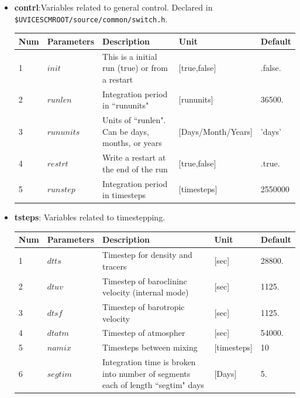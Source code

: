 \documentclass[a4paper]{article}
\begin{document}
\begin{itemize}

\item \textbf{contrl}:Variables related to general control. Declared in \verb|$UVICESCMROOT/source/common/switch.h|.
{\footnotesize
\begin{longtable}{lllll} \hline
  Num  & Parameters         & Description                                                                      & Unit                  & Default    \\ \hline 
  1    & $init$             & This is a initial run (true) or from a restart                                   & [true,false]          & .false.    \\
  2    & $runlen$           & Integration period in ``rununits"                                                & [rununits]            & 36500.     \\
  3    & $rununits$         & Units of ``runlen". Can be days, months, or years                                & [Days/Month/Years]    & 'days'     \\
  4    & $restrt$           & Write a restart at the end of the run                                            & [true,false]          & .true.     \\
  5    & $runstep$          & Integration period in timesteps                                                  & [timesteps]           & 2550000    \\ \hline
    \end{longtable}}
\item \textbf{tsteps}: Variables related to timestepping. 
{\footnotesize
\begin{longtable}{lllll} \hline
  Num  & Parameters         & Description                                                                      & Unit                  & Default    \\ \hline 
  1    & $dtts$             & Timestep for density and tracers                                                 & [sec]                 & 28800.     \\
  2    & $dtuv$             & Timestep of baroclininc velocity (internal mode)                                 & [sec]                 & 1125.      \\
  3    & $dtsf$             & Timestep of barotropic velocity                                                  & [sec]                 & 1125.      \\
  4    & $dtatm$            & Timestep of atmospher                                                            & [sec]                 & 54000.     \\
  5    & $namix$            & Timesteps between mixing                                                         & [timesteps]           & 10         \\
  6    & $segtim$           & Integration time is broken into number of segments each of length ``segtim" days & [Days]                & 5.        \\ \hline
    \end{longtable}}
      

\end{itemize}
\end{document}
